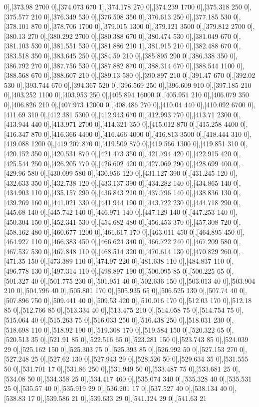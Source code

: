 {0],[373.98 2700 0],[374.073 670 1],[374.178 270 0],[374.239 1700 0],[375.318 250 0],[375.577 210 0],[376.349 530 0],[376.508 350 0],[376.613 250 0],[377.185 530 0],[378.101 870 0],[378.706 1700 0],[379.015 1300 0],[379.121 3500 0],[379.812 2700 0],[380.13 270 0],[380.292 2700 0],[380.388 670 0],[380.474 530 0],[381.049 670 0],[381.103 530 0],[381.551 530 0],[381.886 210 1],[381.915 210 0],[382.488 670 0],[383.518 350 0],[383.645 250 0],[384.59 210 0],[385.895 290 0],[386.338 350 0],[386.792 270 0],[387.756 530 0],[387.882 870 0],[388.314 670 0],[388.544 1100 0],[388.568 670 0],[388.607 210 0],[389.13 580 0],[390.897 210 0],[391.47 670 0],[392.02 530 0],[393.744 670 0],[394.367 520 0],[396.569 250 0],[396.609 910 0],[397.185 210 0],[403.252 1100 0],[403.953 250 0],[405.894 16000 0],[405.951 210 0],[406.079 350 0],[406.826 210 0],[407.973 12000 0],[408.486 270 0],[410.04 440 0],[410.092 6700 0],[411.69 310 0],[412.381 5300 0],[412.943 670 0],[412.993 770 0],[413.71 2300 0],[413.944 440 0],[413.971 2700 0],[414.321 350 0],[415.012 870 0],[415.258 4400 0],[416.347 870 0],[416.366 4400 0],[416.466 4000 0],[416.813 3500 0],[418.444 310 0],[419.088 1200 0],[419.207 870 0],[419.509 870 0],[419.566 1300 0],[419.851 310 0],[420.152 350 0],[420.531 870 0],[421.473 350 0],[421.794 420 0],[422.915 420 0],[425.544 250 0],[426.205 770 0],[426.602 420 0],[427.069 290 0],[428.699 400 0],[429.96 580 0],[430.099 580 0],[430.956 120 0],[431.127 390 0],[431.245 120 0],[432.633 350 0],[432.738 120 0],[433.137 390 0],[434.282 140 0],[434.865 140 0],[434.903 110 0],[435.157 290 0],[436.843 210 0],[437.796 140 0],[438.836 130 0],[439.269 160 0],[441.021 330 0],[441.944 190 0],[443.722 230 0],[444.718 290 0],[445.68 140 0],[445.742 140 0],[446.971 140 0],[447.129 140 0],[447.253 140 0],[450.304 150 0],[452.341 530 0],[454.682 480 0],[456.453 370 0],[457.308 720 0],[458.162 480 0],[460.677 1200 0],[461.617 170 0],[463.011 450 0],[464.895 450 0],[464.927 110 0],[466.383 450 0],[466.624 340 0],[466.722 240 0],[467.209 580 0],[467.537 530 0],[467.848 110 0],[468.514 320 0],[470.614 130 0],[470.829 260 0],[471.35 150 0],[473.389 110 0],[474.97 220 0],[481.638 110 0],[484.837 110 0],[496.778 130 0],[497.314 110 0],[498.897 190 0],[500.095 85 0],[500.225 65 0],[501.327 40 0],[501.775 230 0],[501.951 40 0],[502.636 150 0],[503.013 40 0],[503.904 210 0],[504.796 40 0],[505.801 170 0],[505.935 65 0],[506.525 130 0],[507.74 40 0],[507.896 750 0],[509.441 40 0],[509.53 420 0],[510.016 170 0],[512.03 170 0],[512.18 85 0],[512.766 85 0],[513.334 40 0],[513.475 210 0],[514.058 75 0],[514.754 75 0],[515.064 40 0],[515.263 75 0],[516.033 250 0],[516.438 250 0],[518.031 230 0],[518.698 110 0],[518.92 190 0],[519.308 170 0],[519.584 150 0],[520.322 65 0],[520.513 35 0],[521.91 85 0],[522.516 65 0],[523.281 150 0],[523.743 85 0],[524.039 29 0],[525.162 150 0],[525.303 75 0],[525.393 85 0],[526.992 50 0],[527.153 270 0],[527.248 25 0],[527.62 130 0],[527.943 29 0],[528.526 50 0],[529.634 35 0],[531.555 50 0],[531.701 17 0],[531.86 250 0],[531.949 50 0],[533.487 75 0],[533.681 25 0],[534.08 50 0],[534.358 25 0],[534.417 460 0],[535.074 340 0],[535.328 40 0],[535.531 25 0],[535.57 40 0],[535.919 29 0],[536.201 17 0],[537.527 40 0],[538.134 40 0],[538.83 17 0],[539.586 21 0],[539.633 29 0],[541.124 29 0],[541.63 21 }
